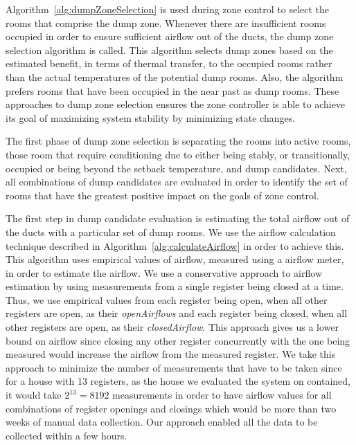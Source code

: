 

Algorithm~\ref{alg:dumpZoneSelection} is used during zone control to select the
rooms that comprise the dump zone. Whenever there are insufficient rooms
occupied in order to ensure sufficient airflow out of the ducts, the dump zone
selection algorithm is called. This algorithm selects dump zones based on the
estimated benefit, in terms of thermal transfer, to the occupied rooms rather
than the actual temperatures of the potential dump rooms. Also, the algorithm
prefers rooms that have been occupied in the near past as dump rooms. These
approaches to dump zone selection ensures the zone controller is able to achieve
its goal of maximizing system stability by minimizing state changes.

The first phase of dump zone selection is separating the rooms into active
rooms, those room that require conditioning due to either being stably, or
transitionally, occupied or being beyond the setback temperature, and dump
candidates. Next, all combinations of dump candidates are evaluated in order to
identify the set of rooms that have the greatest positive impact on the goals of
zone control. 

The first step in dump candidate evaluation is estimating the total airflow out
of the ducts with a particular set of dump rooms. We use the airflow calculation
technique described in Algorithm~\ref{alg:calculateAirflow} in order to achieve
this. This algorithm uses empirical values of airflow, measured using a airflow
meter, in order to estimate the airflow. We use a conservative approach to
airflow estimation by using measurements from a single register being closed at
a time. Thus, we use empirical values from each register being open, when all
other registers are open, as their {\em openAirflows} and each register being
closed, when all other registers are open, as their {\em closedAirflow}. This
approach gives us a lower bound on airflow since closing any other register
concurrently with the one being measured would increase the airflow from the
measured register. We take this approach to minimize the number of measurements
that have to be taken since for a house with 13 registers, as the house we
evaluated the system on contained, it would take $2^{13} = 8192$ measurements in
order to have airflow values for all combinations of register openings and
closings which would be more than two weeks of manual data collection. Our
approach enabled all the data to be collected within a few hours.

